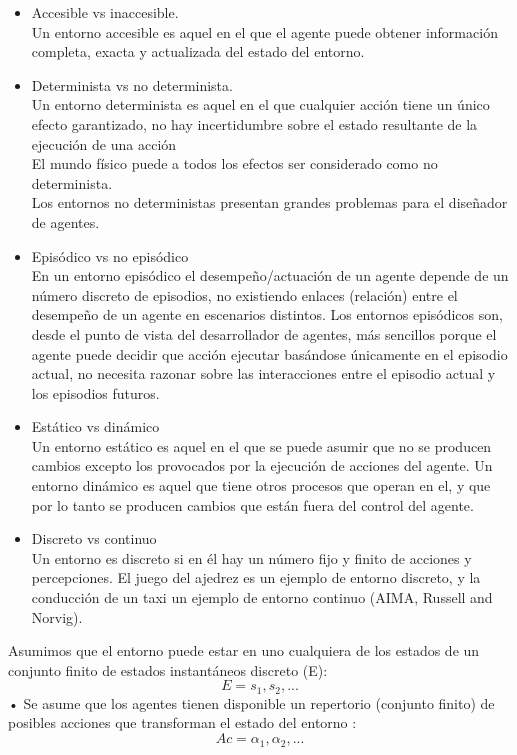\begin{itemize}
   \item Accesible vs inaccesible.\\
   Un entorno accesible es aquel en el que el agente puede
   obtener información completa, exacta y actualizada del
   estado del entorno.
   \item Determinista vs no determinista.\\
   Un entorno determinista es aquel en el que cualquier
   acción tiene un único efecto garantizado, no hay
   incertidumbre sobre el estado resultante de la ejecución de
   una acción\\
   El mundo físico puede a todos los efectos ser
   considerado como no determinista.\\
   Los entornos no deterministas presentan grandes
   problemas para el diseñador de agentes.
   \item Episódico vs no episódico\\
   En un entorno episódico el desempeño/actuación de un
   agente depende de un número discreto de episodios, no
   existiendo enlaces (relación) entre el desempeño de un agente
   en escenarios distintos.
   Los entornos episódicos son, desde el punto de vista del
   desarrollador de agentes, más sencillos porque el agente puede
   decidir que acción ejecutar basándose únicamente en el
   episodio actual, no necesita razonar sobre las interacciones
   entre el episodio actual y los episodios futuros.
   \item Estático vs dinámico\\
   Un entorno estático es aquel en el que se puede asumir que
   no se producen cambios excepto los provocados por la
   ejecución de acciones del agente.
   Un entorno dinámico es aquel que tiene otros procesos que
   operan en el, y que por lo tanto se producen cambios que están
   fuera del control del agente.
   \item Discreto vs continuo\\
   Un entorno es discreto si en él hay un número fijo y finito de
   acciones y percepciones.
   El juego del ajedrez es un ejemplo de entorno discreto, y la
   conducción de un taxi un ejemplo de entorno continuo (AIMA,
   Russell and Norvig).
\end{itemize}

Asumimos que el entorno puede estar en uno cualquiera de los
estados de un conjunto finito de estados instantáneos discreto
(E):
\begin{equation}
   E = { s_1,s_2,...}
\end{equation}
• Se asume que los agentes tienen disponible un repertorio
(conjunto finito) de posibles acciones que transforman el
estado del entorno :
\begin{equation}
   Ac = { \alpha_1,\alpha_2,...}
\end{equation}

